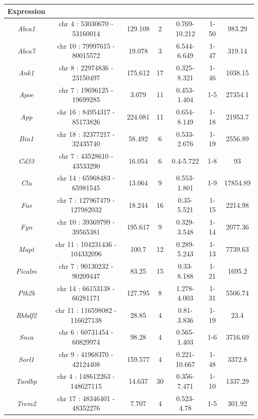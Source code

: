 \begin{landscape}
\begin{table}[]
\begin{threeparttable}
\begin{tabular}{@{}ccccccc@{}}
		Expression\tnote{b} \\ \midrule
		\textit{Abca1}  & chr 4 : 53030670 -  53160014   & 129.108 & 2  & 0.769-10.212 & 1-50 & 983.29   \\
		\textit{Abca7}  & chr 10 : 79997615 - 80015572   & 19.078  & 3  & 6.544-6.649  & 1-47 & 319.14   \\
		\textit{Ank1}   & chr 8 : 22974836 - 23150497    & 175.612 & 17 & 0.325-8.321  & 1-46 & 1038.15  \\
		\textit{Apoe}   & chr 7 : 19696125 - 19699285    & 3.079   & 11 & 0.453-1.404  & 1-5  & 27354.1  \\
		\textit{App}    & chr 16 : 84954317 - 85173826   & 224.081 & 11 & 0.654-8.149  & 1-18 & 21953.7  \\
		\textit{Bin1}   & chr 18 : 32377217 - 32435740   & 58.492  & 6  & 0.533-2.676  & 1-19 & 2556.89  \\
		\textit{Cd33}   & chr 7 : 43528610 - 43533290    & 16.054  & 6  & 0.4-5.722    & 1-8  & 93       \\
		\textit{Clu}    & chr 14 : 65968483 - 65981545   & 13.064  & 9  & 0.553-1.801  & 1-9  & 17854.89 \\
		\textit{Fus}    & chr 7 : 127967479 - 127982032  & 18.244  & 16 & 0.35-5.521   & 1-15 & 2214.98  \\
		\textit{Fyn}    & chr 10 : 39369799 - 39565381   & 195.617 & 9  & 0.329-3.548  & 1-14 & 2077.36  \\
		\textit{Mapt}   & chr 11 : 104231436 - 104332096 & 100.7   & 12 & 0.289-5.243  & 1-13 & 7739.63  \\
		\textit{Picalm} & chr 7 : 90130232 - 90209447    & 83.25   & 15 & 0.33-8.188   & 1-21 & 1695.2   \\
		\textit{Ptk2b}  & chr 14 : 66153138 - 66281171   & 127.795 & 8  & 1.278-4.003  & 1-31 & 5506.74  \\
		\textit{Rhbdf2} & chr 11 : 116598082 - 116627138 & 28.85   & 4  & 0.81-3.836   & 1-19 & 23.4     \\
		\textit{Snca}   & chr 6 : 60731454 - 60829974    & 98.28   & 4  & 0.565-1.403  & 1-6  & 3716.69  \\
		\textit{Sorl1}  & chr 9 : 41968370 - 42124408    & 159.577 & 4  & 0.221-10.667 & 1-48 & 3372.8   \\
		\textit{Tardbp} & chr 4 : 148612263 - 148627115  & 14.637  & 30 & 0.356-7.471  & 1-10 & 1337.29  \\
		\textit{Trem2}  & chr 17 : 48346401 - 48352276   & 7.707   & 4  & 0.523-4.78   & 1-5  & 301.92   \\

\end{tabular}
\end{threeparttable}
\end{table}
\end{landscape}
